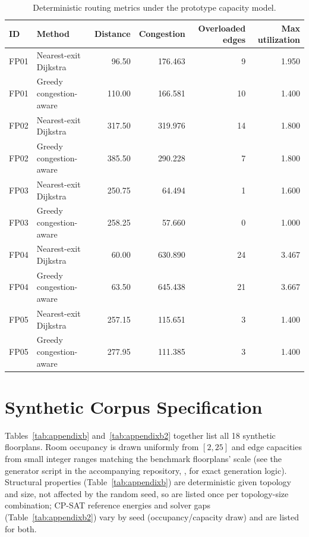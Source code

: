 \documentclass[11pt]{article}
\begin{document}
\begin{table}[h]
\centering
\caption{Deterministic routing metrics under the prototype capacity model.}
\label{tab:appendixa}
\small
\begin{tabular}{llrrrr}
\toprule
ID & Method & Distance & Congestion & Overloaded edges & Max utilization \\
\midrule
FP01 & Nearest-exit Dijkstra & 96.50 & 176.463 & 9 & 1.950 \\
FP01 & Greedy congestion-aware & 110.00 & 166.581 & 10 & 1.400 \\
FP02 & Nearest-exit Dijkstra & 317.50 & 319.976 & 14 & 1.800 \\
FP02 & Greedy congestion-aware & 385.50 & 290.228 & 7 & 1.800 \\
FP03 & Nearest-exit Dijkstra & 250.75 & 64.494 & 1 & 1.600 \\
FP03 & Greedy congestion-aware & 258.25 & 57.660 & 0 & 1.000 \\
FP04 & Nearest-exit Dijkstra & 60.00 & 630.890 & 24 & 3.467 \\
FP04 & Greedy congestion-aware & 63.50 & 645.438 & 21 & 3.667 \\
FP05 & Nearest-exit Dijkstra & 257.15 & 115.651 & 3 & 1.400 \\
FP05 & Greedy congestion-aware & 277.95 & 111.385 & 3 & 1.400 \\
\bottomrule
\end{tabular}
\end{table}

\section{Synthetic Corpus Specification}
\label{sec:appendixB}
Tables~\ref{tab:appendixb} and~\ref{tab:appendixb2} together list all 18 synthetic floorplans. Room occupancy is drawn uniformly from $[2,25]$ and edge capacities from small integer ranges matching the benchmark floorplans' scale (see the generator script in the accompanying repository, , for exact generation logic). Structural properties (Table~\ref{tab:appendixb}) are deterministic given topology and size, not affected by the random seed, so are listed once per topology-size combination; CP-SAT reference energies and solver gaps (Table~\ref{tab:appendixb2}) vary by seed (occupancy/capacity draw) and are listed for both.
\end{document}
